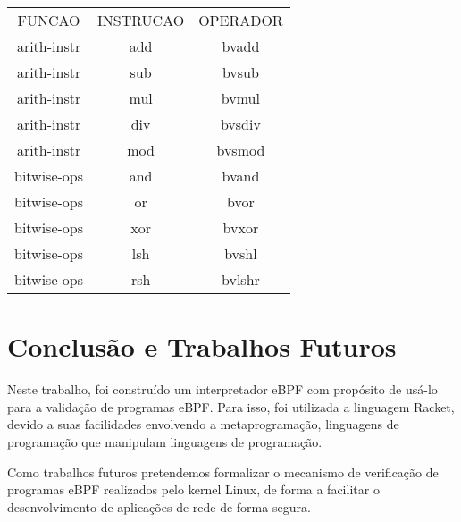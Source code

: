 \documentclass[paper=a4, fontsize=12pt]{article}
\theoremstyle{definition}
\begin{document}
\begin{center}
  \begin{tabular}{ c c c }
    FUNCAO       & INSTRUCAO & OPERADOR\\
    arith-instr  & add       & bvadd\\
    arith-instr  & sub       & bvsub\\
    arith-instr  & mul       & bvmul\\
    arith-instr  & div       & bvsdiv\\
    arith-instr  & mod       & bvsmod\\
    bitwise-ops  & and       & bvand\\
    bitwise-ops  & or        & bvor\\
    bitwise-ops  & xor       & bvxor\\
    bitwise-ops  & lsh       & bvshl\\
    bitwise-ops  & rsh       & bvlshr\\
  \end{tabular}
  \end{center}

\section{Conclusão e Trabalhos Futuros}

Neste trabalho, foi construído um interpretador eBPF com propósito de usá-lo para a validação de
programas eBPF. Para isso, foi utilizada a linguagem Racket, devido a suas facilidades envolvendo
a metaprogramação, linguagens de programação que manipulam linguagens de programação.

Como trabalhos futuros pretendemos formalizar o mecanismo de verificação de programas
eBPF realizados pelo kernel Linux, de forma a facilitar o desenvolvimento de aplicações
de rede de forma segura.




\end{document}
